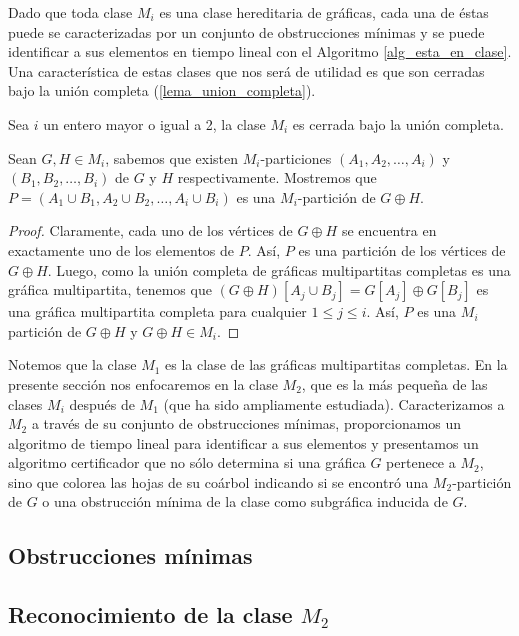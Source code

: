     Dado que toda clase $M_i$ es una clase hereditaria de gráficas, cada una de éstas puede se caracterizadas por un conjunto de obstrucciones mínimas y se puede identificar a sus elementos en tiempo lineal con el Algoritmo \ref{alg_esta_en_clase}. Una característica de estas clases que nos será de utilidad es que son cerradas bajo la unión completa (\ref{lema_union_completa}). 
    
    \begin{lemma}
    \label{lema_union_completa}
    Sea $i$ un entero mayor o igual a 2, la clase $M_i$ es cerrada bajo la unión completa.
    \end{lemma}
    Sean $G,H\in M_i$, sabemos que existen $M_i$-particiones $(A_1,A_2,\dots, A_i)$ y $(B_1,B_2, \dots, B_i)$ de $G$ y $H$ respectivamente. Mostremos que $P = (A_1\cup B_1, A_2\cup B_2, \dots, A_i \cup B_i)$ es una $M_i$-partición de $G\oplus H$.
    \begin{proof}
    Claramente, cada uno de los vértices de $G \oplus H$ se encuentra en exactamente uno de los elementos de $P$. Así, $P$ es una partición de los vértices de $G \oplus H$. Luego, como la unión completa de gráficas multipartitas completas es una gráfica multipartita, tenemos que $(G\oplus H)[A_j\cup B_j] = G[A_j]\oplus G[B_j]$ es una gráfica multipartita completa para cualquier $1\le j \le i$. Así, $P$ es una $M_i$ partición de $G \oplus H$ y $G \oplus H\in M_i$.
    \end{proof}
    
    Notemos que la clase $M_1$ es la clase de las gráficas multipartitas completas. En la presente sección nos enfocaremos en la clase $M_2$, que es la más pequeña de las clases $M_i$ después de $M_1$ (que ha sido ampliamente estudiada). Caracterizamos a $M_2$ a través de su conjunto de obstrucciones mínimas, proporcionamos un algoritmo de tiempo lineal para identificar a sus elementos y presentamos un algoritmo certificador que no sólo determina si una gráfica $G$ pertenece a $M_2$, sino que colorea las hojas de su coárbol indicando si se encontró una $M_2$-partición de $G$ o una obstrucción mínima de la clase como subgráfica inducida de $G$.

    \subsection{Obstrucciones mínimas}
        

    \subsection{Reconocimiento de la clase $M_2$}
        

